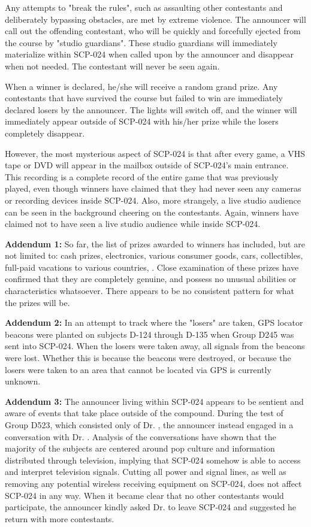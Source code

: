 Any attempts to "break the rules", such as assaulting other contestants and deliberately bypassing obstacles, are met by extreme violence. The announcer will call out the offending contestant, who will be quickly and forcefully ejected from the course by "studio guardians". These studio guardians will immediately materialize within SCP-024 when called upon by the announcer and disappear when not needed. The contestant will never be seen again.

When a winner is declared, he/she will receive a random grand prize. Any contestants that have survived the course but failed to win are immediately declared losers by the announcer. The lights will switch off, and the winner will immediately appear outside of SCP-024 with his/her prize while the losers completely disappear.

However, the most mysterious aspect of SCP-024 is that after every game, a VHS tape or DVD will appear in the mailbox outside of SCP-024's main entrance. This recording is a complete record of the entire game that was previously played, even though winners have claimed that they had never seen any cameras or recording devices inside SCP-024. Also, more strangely, a live studio audience can be seen in the background cheering on the contestants. Again, winners have claimed not to have seen a live studio audience while inside SCP-024.

\textbf{Addendum 1:} So far, the list of prizes awarded to winners has included, but are not limited to: cash prizes, electronics, various consumer goods, cars, collectibles, full-paid vacations to various countries, \expunged. Close examination of these prizes have confirmed that they are completely genuine, and possess no unusual abilities or characteristics whatsoever. There appears to be no consistent pattern for what the prizes will be.

\textbf{Addendum 2:} In an attempt to track where the "losers" are taken, GPS locator beacons were planted on subjects D-124 through D-135 when Group D245 was sent into SCP-024. When the losers were taken away, all signals from the beacons were lost. Whether this is because the beacons were destroyed, or because the losers were taken to an area that cannot be located via GPS is currently unknown.

\textbf{Addendum 3:} The announcer living within SCP-024 appears to be sentient and aware of events that take place outside of the compound. During the test of Group D523, which consisted only of Dr. , the announcer instead engaged in a conversation with Dr. . Analysis of the conversations have shown that the majority of the subjects are centered around pop culture and information distributed through television, implying that SCP-024 somehow is able to access and interpret television signals. Cutting all power and signal lines, as well as removing any potential wireless receiving equipment on SCP-024, does not affect SCP-024 in any way. When it became clear that no other contestants would participate, the announcer kindly asked Dr.  to leave SCP-024 and suggested he return with more contestants.

